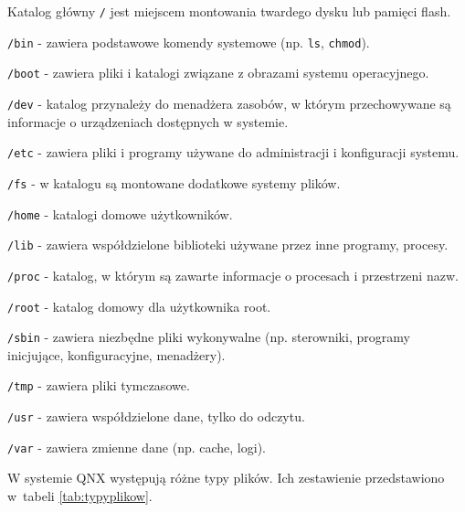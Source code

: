 \begin{myitemize}
\item Katalog główny \lstinline[style=MyBashStyle]{/} jest miejscem montowania twardego dysku lub pamięci flash.
\item \lstinline[style=MyBashStyle]{/bin} - zawiera podstawowe komendy systemowe (np. \lstinline[style=MyBashStyle]{ls}, \lstinline[style=MyBashStyle]{chmod}).
\item \lstinline[style=MyBashStyle]{/boot} - zawiera pliki i katalogi związane z obrazami systemu operacyjnego.
\item \lstinline[style=MyBashStyle]{/dev} - katalog przynależy do menadżera zasobów, w którym przechowywane są informacje o urządzeniach dostępnych w systemie.
\item \lstinline[style=MyBashStyle]{/etc} - zawiera pliki i programy używane do administracji i konfiguracji systemu.
\item \lstinline[style=MyBashStyle]{/fs} - w katalogu są montowane dodatkowe systemy plików.
\item \lstinline[style=MyBashStyle]{/home} - katalogi domowe użytkowników.
\item \lstinline[style=MyBashStyle]{/lib} - zawiera współdzielone biblioteki używane przez inne programy, procesy.
\item \lstinline[style=MyBashStyle]{/proc} - katalog, w którym są zawarte informacje o procesach i przestrzeni nazw.
\item \lstinline[style=MyBashStyle]{/root} - katalog domowy dla użytkownika root.
\item \lstinline[style=MyBashStyle]{/sbin} - zawiera niezbędne pliki wykonywalne (np. sterowniki, programy inicjujące, konfiguracyjne, menadżery).
\item \lstinline[style=MyBashStyle]{/tmp} - zawiera pliki tymczasowe.
\item \lstinline[style=MyBashStyle]{/usr} - zawiera współdzielone dane, tylko do odczytu.
\item \lstinline[style=MyBashStyle]{/var} - zawiera zmienne dane (np. cache, logi).
\end{myitemize}

W systemie QNX występują różne typy plików. Ich zestawienie przedstawiono w~tabeli \ref{tab:typyplikow}.


